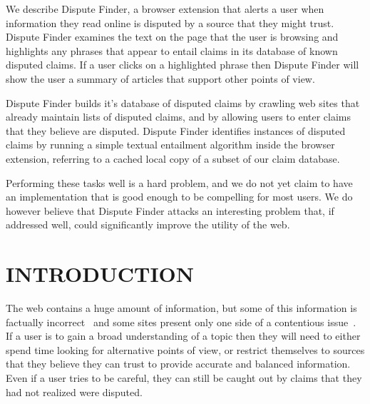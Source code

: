 \documentclass{www2010-submission}
\newcommand{\todo}[1]{}
\begin{document}
\abstract

We describe Dispute Finder, a browser extension that alerts a user when information they read online is disputed by a source that they might trust. Dispute Finder examines the text on the page that the user is browsing and highlights any phrases that appear to entail claims in its database of known disputed claims. If a user clicks on a highlighted phrase then Dispute Finder will show the user a summary of articles that support other points of view.

Dispute Finder builds it's database of disputed claims by crawling web sites that already maintain lists of disputed claims, and by allowing users to enter claims that they believe are disputed. Dispute Finder identifies instances of disputed claims by running a simple textual entailment algorithm inside the browser extension, referring to a cached local copy of a subset of our claim database.

Performing these tasks well is a hard problem, and we do not yet claim to have an implementation that is good enough to be compelling for most users. We do however believe that Dispute Finder attacks an interesting problem that, if addressed well, could significantly improve the utility of the web.






\section{INTRODUCTION}

\todo{update screenshots}

The web contains a huge amount of information, but some of this information is factually incorrect~\cite{Neumann2003,Resnik1998,Zhou2004} and some sites present only one side of a contentious issue~\cite{Herman2002}. 
If a user is to gain a broad understanding of a topic then they will need to either spend time looking for alternative points of view, or restrict themselves to sources that they believe they can trust to provide accurate and balanced information.
Even if a user tries to be careful, they can still be caught out by claims that they had not realized were disputed.
\todo{word this better}\todo{update all screenshots}
\end{document}
